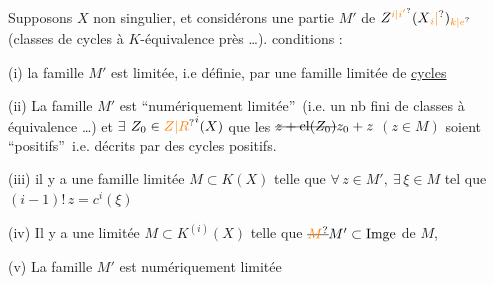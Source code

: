 Supposons  $X$ non singulier, et considérons  une partie $M'$ de $Z^{\unsure{i|i'}}(X\unsure{_{i}|{}})_{\unsure{k|e}}$ (classes de cycles à $K$-équivalence près \ldots).  conditions  :

(i) \deleted{$\exists$}  la famille $M'$ est limitée, i.e définie, par une famille limitée de \uline{cycles} 

(ii) La  famille  $M'$ est \textquotedblleft numériquement limitée\textquotedblright\ (i.e. un nb fini de classes à équivalence  \ldots) et $\exists$   $Z_0\in \unsure{Z|R}^{i}(X)$  que les $\deleted{z+\operatorname{cl}(Z_0)}z_0+z$ $(z\in M)$ soient \textquotedblleft positifs\textquotedblright\ i.e. décrits par des cycles positifs.

(iii)    il y a une famille limitée $M\subset K(X)$  telle que $\forall\,z\in M',\ \exists\,\xi\in M$  tel que $(i-1)!\,z=c^{i}(\xi)$ 

(iv) Il y a une  limitée $M\subset K^{(i)}(X)$ telle que $\deleted{\unsure{M}}M'\subset\operatorname{Imge}$ de $M$,

(v) La famille $M'$ est numériquement limitée

